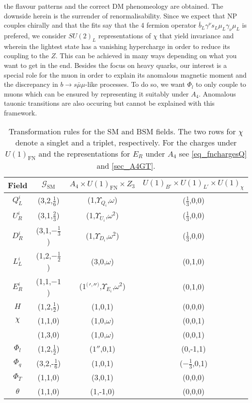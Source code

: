 the flavour patterns and the correct DM phenomeology are obtained. 
The downside herein is the surrender of renormalisability. Since we expect that NP couples chirally and that the fits say that the 4 fermion operator 
$\bar b_L \gamma^\nu s_L \mu_L \gamma_\nu \mu_L$ is prefered, we consider $SU(2)_L$ representations of $\chi$ that yield invariance and wherein the lightest
state has a vanishing hypercharge in order to reduce its coupling to the $Z$. This can be achieved in many ways depending on what you want to get 
in the end. Besides the focus on heavy quarks,
our interest is a special role for the muon in order to explain its anomalous magnetic moment and the discrepancy in  
$b\rightarrow s\bar\mu\mu$-like processes. 
To do so, we want $\Phi_l$ to only couple to muons which can be ensured by representing it suitably under $A_4$. Anomalous tauonic transitions are 
also occuring but cannot be explained with this framework.
\begin{table}[t]
 \begin{tabular}{c|c|c|c}
  Field & $\mathcal{G}_\text{SM}$ & $A_4 \times U(1)_\text{FN} \times Z_3$ & $U(1)_{B'}\times U(1)_{L'}\times U(1)_\chi$\\
  \hline
  $Q^i_L$ & (3,2,$\frac16$) & (1,$\Upsilon_{Q_i}$,$\omega$) & ($\frac13$,0,0)\\
  $U^i_R$ & (3,1,$\frac23$) & (1,$\Upsilon_{U_i}$,$\omega^2$)& ($\frac13$,0,0)\\
  $D^i_R$ & (3,1,$-\frac13$) & (1,$\Upsilon_{D_i}$,$\omega^2$)& ($\frac13$,0,0)\\
  $L^i_L$ & (1,2,$-\frac12$) & (3,0,$\omega$)& (0,1,0)\\
  $E^i_R$ & (1,1,$-1$) & ($1 {^(} {'} {^,} '' {^)} $,$\Upsilon_{E_i}$,$\omega^2$)& (0,1,0)\\
  $H$ & (1,2,$\frac12$) & (1,0,1)& (0,0,0)\\
  \hline
  $\chi$ & (1,1,0) & (1,0,$\omega$)& (0,0,1)\\ %
 & (1,3,0) & (1,0,$\omega$)&(0,0,1)\\
  $\Phi_l$ & (1,2,$\frac12$) & ($1''$,0,1)& (0,-1,1)\\
  $\Phi_q$ & (3,2,-$\frac16$) & ($1$,0,1)& ($-\frac13$,0,1)\\
  \hline
  $\Phi_T$ & (1,1,0) & ($3$,0,1)& (0,0,0)\\
  $\theta$ & (1,1,0) & (1,-1,0) & (0,0,0)
 \end{tabular}
\caption{Transformation rules for the SM and BSM fields. The two rows for $\chi$ denote a singlet and a triplet, respectively. For the charges under 
$U(1)_\text{FN}$ and the representations for $E_R$ under $A_4$ see \eqref{eq_fnchargesQ} and \ref{sec_A4GT}.}
\label{tab_models}
\end{table}
